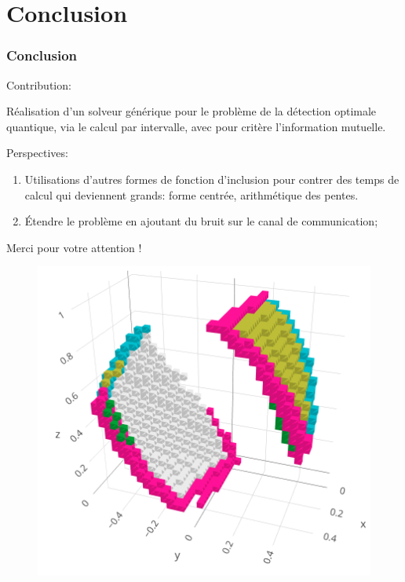 \documentclass{beamer}
\begin{document}
\section[Conclusion]{Conclusion}
\begin{frame}
    \frametitle{Conclusion}

    Contribution:

    Réalisation d'un solveur générique pour le problème de la détection optimale quantique, via le calcul par intervalle, avec pour critère l'information mutuelle.

    \medbreak
    
    Perspectives:
    \begin{enumerate}

        \item Utilisations d'autres formes de fonction d'inclusion pour contrer des temps de calcul qui deviennent grands: forme centrée, arithmétique des pentes.
        \item \'Etendre le problème en ajoutant du bruit sur le canal de communication;

    \end{enumerate}
\end{frame}

\begin{frame}
    \begin{center}
        Merci pour votre attention !
    \end{center}

    \begin{figure}
        \centering
        \includegraphics[scale=0.2]{images/illustration_boites.png}
    \end{figure}
\end{frame}
\end{document}
